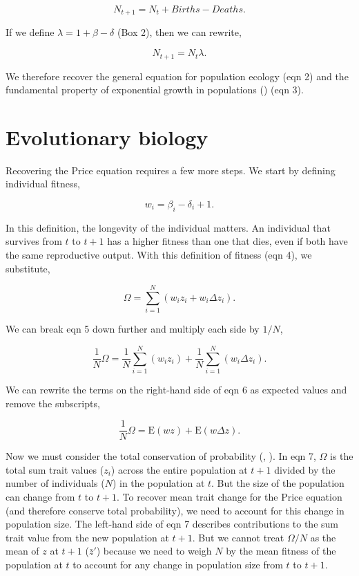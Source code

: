\documentclass[
]{article}
\begin{document}
\[N_{t+1} = N_{t} + Births - Deaths.
\tag{2}
\]

If we define \(\lambda = 1 + \beta - \delta\) (Box 2), then we can
rewrite,

\[N_{t+1} = N_{t}\lambda.
\tag{3}
\]

We therefore recover the general equation for population ecology (eqn 2)
and the fundamental property of exponential growth in populations
() (eqn 3).

\section{Evolutionary biology}\label{evolutionary-biology}

Recovering the Price equation requires a few more steps. We start by
defining individual fitness,

\[w_{i} = \beta_{i} - \delta_{i} + 1.
\tag{4}
\]

In this definition, the longevity of the individual matters. An
individual that survives from \(t\) to \(t + 1\) has a higher fitness
than one that dies, even if both have the same reproductive output. With
this definition of fitness (eqn 4), we substitute,

\[\Omega = \sum_{i=1}^{N} \left(w_{i}z_{i} + w_{i}\Delta z_{i} \right).
\tag{5}
\]

We can break eqn 5 down further and multiply each side by \(1/N\),

\[\frac{1}{N}\Omega = \frac{1}{N}\sum_{i=1}^{N} \left(w_{i}z_{i} \right) + \frac{1}{N}\sum_{i=1}^{N}\left( w_{i}\Delta z_{i} \right).
\tag{6}
\]

We can rewrite the terms on the right-hand side of eqn 6 as expected
values and remove the subscripts,

\[\frac{1}{N}\Omega = \mathrm{E}\left(w z \right) + \mathrm{E}\left( w \Delta z  \right).
\tag{7}
\]

Now we must consider the total conservation of probability
(, ).
In eqn 7, \(\Omega\) is the total sum trait values (\(z_{i}\)) across
the entire population at \(t + 1\) divided by the number of individuals
(\(N\)) in the population at \(t\). But the size of the population can
change from \(t\) to \(t + 1\). To recover mean trait change for the
Price equation (and therefore conserve total probability), we need to
account for this change in population size. The left-hand side of eqn 7
describes contributions to the sum trait value from the new population
at \(t + 1\). But we cannot treat \(\Omega/N\) as the mean of \(z\) at
\(t+1\) (\(\bar{z}'\)) because we need to weigh \(N\) by the mean
fitness of the population at \(t\) to account for any change in
population size from \(t\) to \(t+1\).
\end{document}
